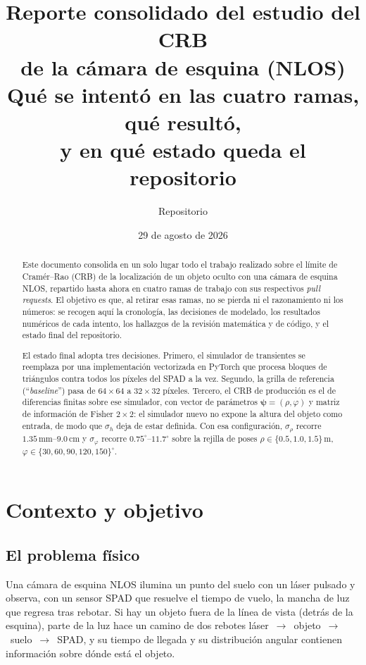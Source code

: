 \documentclass[11pt,a4paper]{article}
\title{\textbf{Reporte consolidado del estudio del CRB\\
de la cámara de esquina (NLOS)}\\[3mm]
\large Qué se intentó en las cuatro ramas, qué resultó,\\
y en qué estado queda el repositorio}
\author{Repositorio \code{crb}}
\date{29 de agosto de 2026}
\newcommand{\vect}[1]{\boldsymbol{#1}}
\theoremstyle{definition}
\begin{document}
\maketitle

\begin{abstract}
Este documento consolida en un solo lugar todo el trabajo realizado sobre el
límite de Cramér--Rao (CRB) de la localización de un objeto oculto con una
cámara de esquina NLOS, repartido hasta ahora en cuatro ramas de trabajo con sus
respectivos \emph{pull requests}. El objetivo es que, al retirar esas ramas, no
se pierda ni el razonamiento ni los números: se recogen aquí la cronología, las
decisiones de modelado, los resultados numéricos de cada intento, los hallazgos
de la revisión matemática y de código, y el estado final del repositorio.

El estado final adopta tres decisiones. Primero, el simulador de transientes se
reemplaza por una implementación vectorizada en PyTorch que procesa bloques de
triángulos contra todos los píxeles del SPAD a la vez. Segundo, la grilla de
referencia (\enquote{\emph{baseline}}) pasa de $64\times64$ a $32\times32$ píxeles.
Tercero, el CRB de producción es el de diferencias finitas sobre ese simulador,
con vector de parámetros $\vect\psi=(\rho,\varphi)$ y matriz de información de
Fisher $2\times2$: el simulador nuevo no expone la altura del objeto como
entrada, de modo que $\sigma_h$ deja de estar definida. Con esa configuración,
$\sigma_\rho$ recorre $1.35\,\text{mm}$--$9.0\,\text{cm}$ y $\sigma_\varphi$
recorre $0.75^\circ$--$11.7^\circ$ sobre la rejilla de poses
$\rho\in\{0.5,1.0,1.5\}\,$m, $\varphi\in\{30,60,90,120,150\}^\circ$.
\end{abstract}

\tableofcontents

\section{Contexto y objetivo}
\label{sec:contexto}

\subsection{El problema físico}

Una cámara de esquina NLOS ilumina un punto del suelo con un láser pulsado y
observa, con un sensor SPAD que resuelve el tiempo de vuelo, la mancha de luz
que regresa tras rebotar. Si hay un objeto fuera de la línea de vista (detrás de
la esquina), parte de la luz hace un camino de dos rebotes
láser~$\to$~objeto~$\to$~suelo~$\to$~SPAD, y su tiempo de llegada y su
distribución angular contienen información sobre dónde está el objeto.
\end{document}
